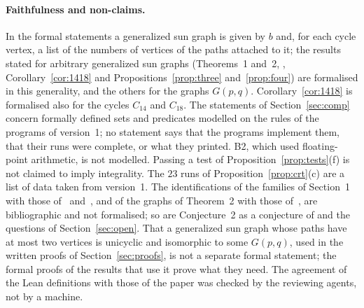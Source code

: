 \documentclass[11pt]{article}
\theoremstyle{definition}
\theoremstyle{remark}
\begin{document}
\paragraph{Faithfulness and non-claims.}
In the formal statements a generalized sun graph is given by $b$ and, for each
cycle vertex, a list of the numbers of vertices of the paths attached to it;
the results stated for arbitrary generalized sun graphs (Theorems~1 and~2,
\cite[Theorem~2.1]{bms}, Corollary~\ref{cor:1418} and
Propositions~\ref{prop:three} and~\ref{prop:four}) are formalised in this
generality, and the others for the graphs $G(p,q)$. Corollary~\ref{cor:1418}
is formalised also for the cycles $C_{14}$ and $C_{18}$. The statements of
Section~\ref{sec:comp} concern formally defined sets and predicates modelled on
the rules of the programs of version~1; no statement says that the programs
implement them, that their runs were complete, or what they printed. B2, which
used floating-point arithmetic, is not modelled. Passing a test of
Proposition~\ref{prop:tests}(f) is not claimed to imply integrality. The $23$
runs of Proposition~\ref{prop:crt}(c) are a list of data taken from version~1.
The identifications of the families of Section~1 with those of~\cite{bms}
and~\cite{ver}, and of the graphs of Theorem~2 with those of~\cite{brt}, are
bibliographic and not formalised; so are Conjecture~2 as a conjecture of
\cite{bdr} and the questions of Section~\ref{sec:open}. That a generalized
sun graph whose paths have at most two vertices is unicyclic and isomorphic to
some $G(p,q)$, used in the written proofs of Section~\ref{sec:proofs}, is not
a separate formal statement; the formal proofs of the results that use it
prove what they need. The agreement of the Lean definitions with those of the
paper was checked by the reviewing agents, not by a machine.
\end{document}
